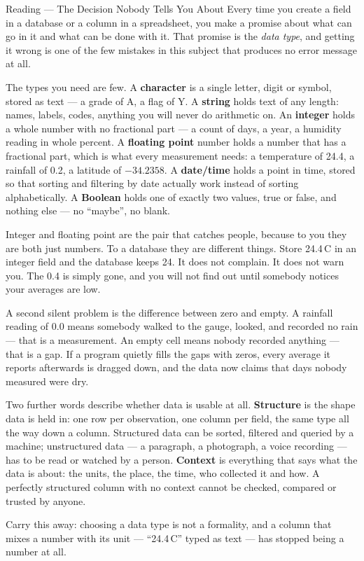 \documentclass[11pt,a4paper]{article}
\begin{document}
\begin{readingbox}{Reading --- The Decision Nobody Tells You About}
Every time you create a field in a database or a column in a spreadsheet, you make a promise about what can go in it and what can be done with it. That promise is the \emph{data type}, and getting it wrong is one of the few mistakes in this subject that produces no error message at all.

The types you need are few. A \textbf{character} is a single letter, digit or symbol, stored as text --- a grade of A, a flag of Y. A \textbf{string} holds text of any length: names, labels, codes, anything you will never do arithmetic on. An \textbf{integer} holds a whole number with no fractional part --- a count of days, a year, a humidity reading in whole percent. A \textbf{floating point} number holds a number that has a fractional part, which is what every measurement needs: a temperature of 24.4, a rainfall of 0.2, a latitude of $-34.2358$. A \textbf{date/time} holds a point in time, stored so that sorting and filtering by date actually work instead of sorting alphabetically. A \textbf{Boolean} holds one of exactly two values, true or false, and nothing else --- no ``maybe'', no blank.

Integer and floating point are the pair that catches people, because to you they are both just numbers. To a database they are different things. Store 24.4\,\textdegree C in an integer field and the database keeps 24. It does not complain. It does not warn you. The 0.4 is simply gone, and you will not find out until somebody notices your averages are low.

A second silent problem is the difference between zero and empty. A rainfall reading of 0.0 means somebody walked to the gauge, looked, and recorded no rain --- that is a measurement. An empty cell means nobody recorded anything --- that is a gap. If a program quietly fills the gaps with zeros, every average it reports afterwards is dragged down, and the data now claims that days nobody measured were dry.

Two further words describe whether data is usable at all. \textbf{Structure} is the shape data is held in: one row per observation, one column per field, the same type all the way down a column. Structured data can be sorted, filtered and queried by a machine; unstructured data --- a paragraph, a photograph, a voice recording --- has to be read or watched by a person. \textbf{Context} is everything that says what the data is about: the units, the place, the time, who collected it and how. A perfectly structured column with no context cannot be checked, compared or trusted by anyone.

Carry this away: choosing a data type is not a formality, and a column that mixes a number with its unit --- ``24.4\,\textdegree C'' typed as text --- has stopped being a number at all.
\end{readingbox}
\end{document}
